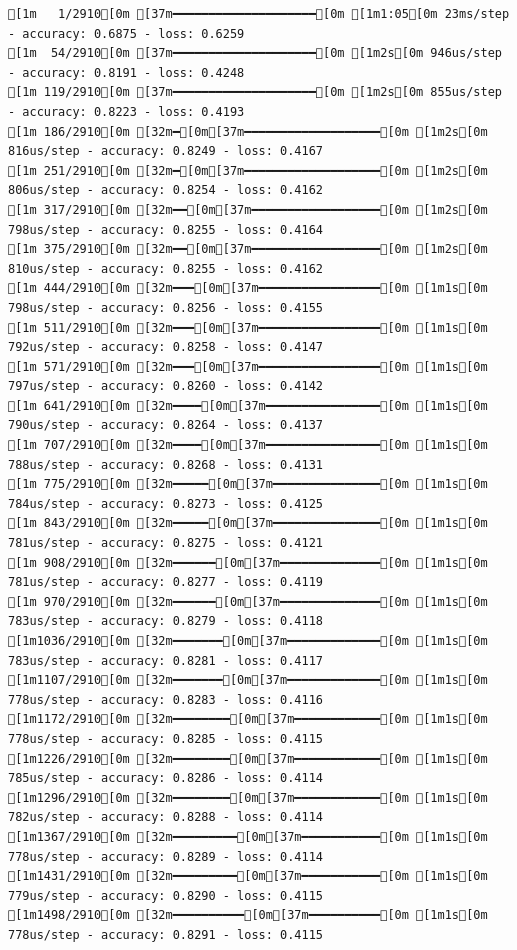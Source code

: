 \documentclass[
  letterpaper,
  DIV=11,
  numbers=noendperiod]{scrartcl}
\begin{document}
\begin{verbatim}
[1m   1/2910[0m [37m━━━━━━━━━━━━━━━━━━━━[0m [1m1:05[0m 23ms/step - accuracy: 0.6875 - loss: 0.6259
[1m  54/2910[0m [37m━━━━━━━━━━━━━━━━━━━━[0m [1m2s[0m 946us/step - accuracy: 0.8191 - loss: 0.4248 
[1m 119/2910[0m [37m━━━━━━━━━━━━━━━━━━━━[0m [1m2s[0m 855us/step - accuracy: 0.8223 - loss: 0.4193
[1m 186/2910[0m [32m━[0m[37m━━━━━━━━━━━━━━━━━━━[0m [1m2s[0m 816us/step - accuracy: 0.8249 - loss: 0.4167
[1m 251/2910[0m [32m━[0m[37m━━━━━━━━━━━━━━━━━━━[0m [1m2s[0m 806us/step - accuracy: 0.8254 - loss: 0.4162
[1m 317/2910[0m [32m━━[0m[37m━━━━━━━━━━━━━━━━━━[0m [1m2s[0m 798us/step - accuracy: 0.8255 - loss: 0.4164
[1m 375/2910[0m [32m━━[0m[37m━━━━━━━━━━━━━━━━━━[0m [1m2s[0m 810us/step - accuracy: 0.8255 - loss: 0.4162
[1m 444/2910[0m [32m━━━[0m[37m━━━━━━━━━━━━━━━━━[0m [1m1s[0m 798us/step - accuracy: 0.8256 - loss: 0.4155
[1m 511/2910[0m [32m━━━[0m[37m━━━━━━━━━━━━━━━━━[0m [1m1s[0m 792us/step - accuracy: 0.8258 - loss: 0.4147
[1m 571/2910[0m [32m━━━[0m[37m━━━━━━━━━━━━━━━━━[0m [1m1s[0m 797us/step - accuracy: 0.8260 - loss: 0.4142
[1m 641/2910[0m [32m━━━━[0m[37m━━━━━━━━━━━━━━━━[0m [1m1s[0m 790us/step - accuracy: 0.8264 - loss: 0.4137
[1m 707/2910[0m [32m━━━━[0m[37m━━━━━━━━━━━━━━━━[0m [1m1s[0m 788us/step - accuracy: 0.8268 - loss: 0.4131
[1m 775/2910[0m [32m━━━━━[0m[37m━━━━━━━━━━━━━━━[0m [1m1s[0m 784us/step - accuracy: 0.8273 - loss: 0.4125
[1m 843/2910[0m [32m━━━━━[0m[37m━━━━━━━━━━━━━━━[0m [1m1s[0m 781us/step - accuracy: 0.8275 - loss: 0.4121
[1m 908/2910[0m [32m━━━━━━[0m[37m━━━━━━━━━━━━━━[0m [1m1s[0m 781us/step - accuracy: 0.8277 - loss: 0.4119
[1m 970/2910[0m [32m━━━━━━[0m[37m━━━━━━━━━━━━━━[0m [1m1s[0m 783us/step - accuracy: 0.8279 - loss: 0.4118
[1m1036/2910[0m [32m━━━━━━━[0m[37m━━━━━━━━━━━━━[0m [1m1s[0m 783us/step - accuracy: 0.8281 - loss: 0.4117
[1m1107/2910[0m [32m━━━━━━━[0m[37m━━━━━━━━━━━━━[0m [1m1s[0m 778us/step - accuracy: 0.8283 - loss: 0.4116
[1m1172/2910[0m [32m━━━━━━━━[0m[37m━━━━━━━━━━━━[0m [1m1s[0m 778us/step - accuracy: 0.8285 - loss: 0.4115
[1m1226/2910[0m [32m━━━━━━━━[0m[37m━━━━━━━━━━━━[0m [1m1s[0m 785us/step - accuracy: 0.8286 - loss: 0.4114
[1m1296/2910[0m [32m━━━━━━━━[0m[37m━━━━━━━━━━━━[0m [1m1s[0m 782us/step - accuracy: 0.8288 - loss: 0.4114
[1m1367/2910[0m [32m━━━━━━━━━[0m[37m━━━━━━━━━━━[0m [1m1s[0m 778us/step - accuracy: 0.8289 - loss: 0.4114
[1m1431/2910[0m [32m━━━━━━━━━[0m[37m━━━━━━━━━━━[0m [1m1s[0m 779us/step - accuracy: 0.8290 - loss: 0.4115
[1m1498/2910[0m [32m━━━━━━━━━━[0m[37m━━━━━━━━━━[0m [1m1s[0m 778us/step - accuracy: 0.8291 - loss: 0.4115

\end{verbatim}
\end{document}
